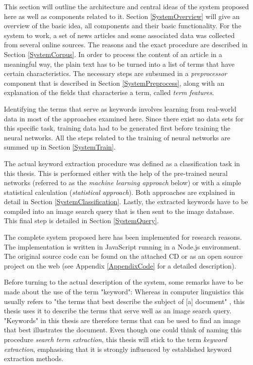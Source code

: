 \documentclass[11pt,a4paper,twoside]{article}
\begin{document}
This section will outline the architecture and central ideas of the system proposed here as well as components related to it. Section \ref{SystemOverview} will give an overview of the basic idea, all components and their basic functionality. For the system to work, a set of news articles and some associated data was collected from several online sources. The reasons and the exact procedure are described in Section \ref{SystemCorpus}. In order to process the content of an article in a meaningful way, the plain text has to be turned into a list of terms that have certain characteristics. The necessary steps are subsumed in a \emph{preprocessor} component that is described in Section \ref{SystemPreprocess}, along with an explanation of the fields that characterise a term, called \emph{term features}.

Identifying the terms that serve as keywords involves learning from real-world data in most of the approaches examined here. Since there exist no data sets for this specific task, training data had to be generated first before training the neural networks. All the steps related to the training of neural networks are summed up in Section \ref{SystemTrain}.

The actual keyword extraction procedure was defined as a classification task in this thesis. This is performed either with the help of the pre-trained neural networks (referred to as the \emph{machine learning approach} below) or with a simple statistical calculation (\emph{statistical approach}). Both approaches are explained in detail in Section \ref{SystemClassification}. Lastly, the extracted keywords have to be compiled into an image search query that is then sent to the image database. This final step is detailed in Section \ref{SystemQuery}.

The complete system proposed here has been implemented for research reasons. The implementation is written in JavaScript running in a Node.js environment. The original source code can be found on the attached CD or as an open source project on the web (see Appendix \ref{AppendixCode} for a detailed description).

Before turning to the actual description of the system, some remarks have to be made about the use of the term "keyword": Whereas in computer linguistics this usually refers to "the terms that best describe the subject of [a] document" \cite[p. 1]{Beliga2014KeywordApproaches}, this thesis uses it to describe the terms that serve well as an image search query. "Keywords" in this thesis are therefore terms that can be used to find an image that best illustrates the document. Even though one could think of naming this procedure \emph{search term extraction}, this thesis will stick to the term \emph{keyword extraction}, emphasising that it is strongly influenced by established keyword extraction methods.
\end{document}
